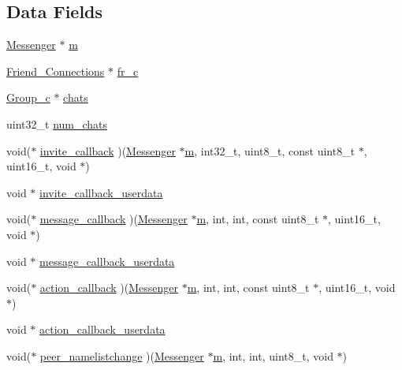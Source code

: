 \subsection*{Data Fields}
\begin{DoxyCompactItemize}
\item 
\hyperlink{struct_messenger}{Messenger} $\ast$ \hyperlink{struct_group___chats_aea6eb6c7c30a659f1b0dee83eaf03ea2}{m}
\item 
\hyperlink{struct_friend___connections}{Friend\+\_\+\+Connections} $\ast$ \hyperlink{struct_group___chats_ae26eb43a606fff20fe70209d051c40f9}{fr\+\_\+c}
\item 
\hyperlink{struct_group__c}{Group\+\_\+c} $\ast$ \hyperlink{struct_group___chats_a2a89a032b3d68d95f8cbecf4ecec9e74}{chats}
\item 
uint32\+\_\+t \hyperlink{struct_group___chats_af6dc2bcdf8d71e0faaa6601befa94d9b}{num\+\_\+chats}
\item 
void($\ast$ \hyperlink{struct_group___chats_a4ff3e6778b94fb9425a4b36572a0bf8b}{invite\+\_\+callback} )(\hyperlink{struct_messenger}{Messenger} $\ast$\hyperlink{struct_group___chats_aea6eb6c7c30a659f1b0dee83eaf03ea2}{m}, int32\+\_\+t, uint8\+\_\+t, const uint8\+\_\+t $\ast$, uint16\+\_\+t, void $\ast$)
\item 
void $\ast$ \hyperlink{struct_group___chats_a4a640f20c34159b06875274fedf9dc69}{invite\+\_\+callback\+\_\+userdata}
\item 
void($\ast$ \hyperlink{struct_group___chats_a0f49e6a148c90647f5280d35d0f7a9d0}{message\+\_\+callback} )(\hyperlink{struct_messenger}{Messenger} $\ast$\hyperlink{struct_group___chats_aea6eb6c7c30a659f1b0dee83eaf03ea2}{m}, int, int, const uint8\+\_\+t $\ast$, uint16\+\_\+t, void $\ast$)
\item 
void $\ast$ \hyperlink{struct_group___chats_a593c4aa670d5dc3d9fcd842fb8d5a6fe}{message\+\_\+callback\+\_\+userdata}
\item 
void($\ast$ \hyperlink{struct_group___chats_a61996fdab7da709944de726b88872d61}{action\+\_\+callback} )(\hyperlink{struct_messenger}{Messenger} $\ast$\hyperlink{struct_group___chats_aea6eb6c7c30a659f1b0dee83eaf03ea2}{m}, int, int, const uint8\+\_\+t $\ast$, uint16\+\_\+t, void $\ast$)
\item 
void $\ast$ \hyperlink{struct_group___chats_ab8194101242ca87c3ee0fd11f7717569}{action\+\_\+callback\+\_\+userdata}
\item 
void($\ast$ \hyperlink{struct_group___chats_a3f11f69cf6d4e6d1ed57b5306b097baf}{peer\+\_\+namelistchange} )(\hyperlink{struct_messenger}{Messenger} $\ast$\hyperlink{struct_group___chats_aea6eb6c7c30a659f1b0dee83eaf03ea2}{m}, int, int, uint8\+\_\+t, void $\ast$)

\end{DoxyCompactItemize}
